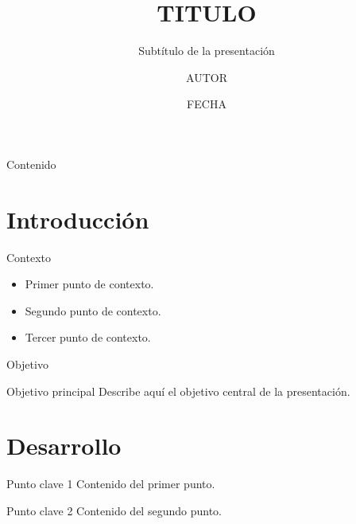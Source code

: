 \documentclass[aspectratio=169, 12pt]{beamer}
\title{{{TITULO}}}
\subtitle{Subtítulo de la presentación}
\author{{{AUTOR}}}
\institute{Institución}
\date{{{FECHA}}}
\begin{document}
\begin{frame}
  \titlepage
\end{frame}

\begin{frame}{Contenido}
  \tableofcontents
\end{frame}

\section{Introducción}

\begin{frame}{Contexto}
  \begin{itemize}
    \item Primer punto de contexto.
    \item Segundo punto de contexto.
    \item Tercer punto de contexto.
  \end{itemize}
\end{frame}

\begin{frame}{Objetivo}
  \begin{alertblock}{Objetivo principal}
    Describe aquí el objetivo central de la presentación.
  \end{alertblock}
\end{frame}

\section{Desarrollo}

\begin{frame}{Punto clave 1}
  Contenido del primer punto.

\end{frame}

\begin{frame}{Punto clave 2}
  Contenido del segundo punto.

\end{frame}
\end{document}
